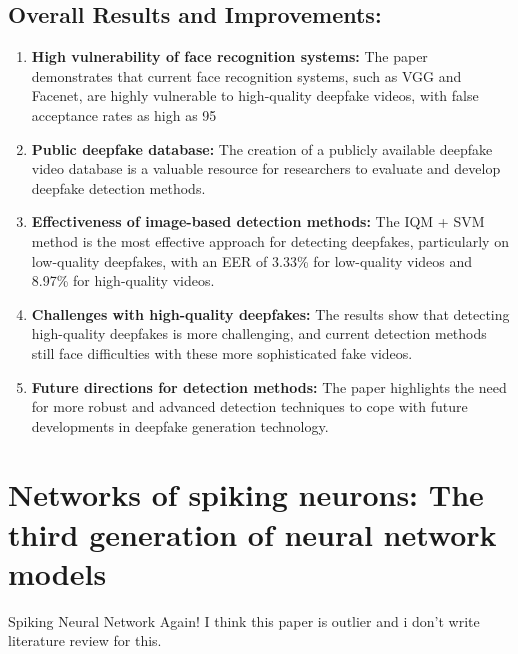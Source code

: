 \documentclass{report}
\begin{document}
	
	
	\section{Overall Results and Improvements:}
	\begin{enumerate}
		\item 
		\textbf{High vulnerability of face recognition systems:} The paper demonstrates that current face recognition systems, such as VGG and Facenet, are highly vulnerable to high-quality deepfake videos, with false acceptance rates as high as 95%
		
		\item 
		\textbf{Public deepfake database:} The creation of a publicly available deepfake video database is a valuable resource for researchers to evaluate and develop deepfake detection methods.
		
		\item 
		\textbf{Effectiveness of image-based detection methods:} The IQM + SVM method is the most effective approach for detecting deepfakes, particularly on low-quality deepfakes, with an EER of 3.33\% for low-quality videos and 8.97\% for high-quality videos.
		
		\item 
		\textbf{Challenges with high-quality deepfakes:} The results show that detecting high-quality deepfakes is more challenging, and current detection methods still face difficulties with these more sophisticated fake videos.
		
		\item 
		\textbf{Future directions for detection methods:} The paper highlights the need for more robust and advanced detection techniques to cope with future developments in deepfake generation technology.
	\end{enumerate}
	
	
	
	
	
	
	
	
	
	
	\chapter{Networks of spiking neurons: The third generation of neural network models \cite{maass1997networks}}
	
	Spiking Neural Network Again!
	I think this paper is outlier and i don't write literature review for this.
	
	
	
\end{document}
